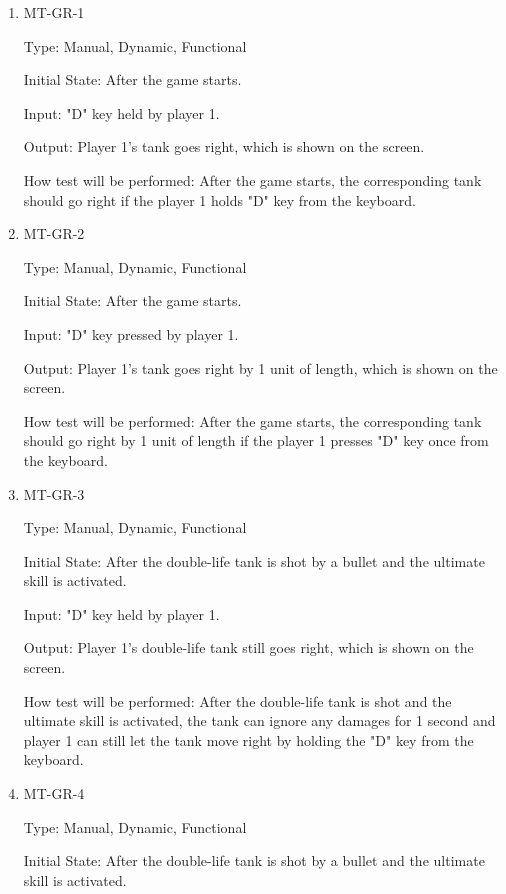 \documentclass[12pt, titlepage]{article}
\begin{document}
\begin{enumerate}

\item{MT-GR-1\\}

Type: Manual, Dynamic, Functional
					
Initial State: After the game starts.
					
Input: "D" key held by player 1.
					
Output: Player 1's tank goes right, which is shown on the screen.
					
How test will be performed: After the game starts, the corresponding tank should go right if the player 1 holds "D" key from the keyboard. 
					
\item{MT-GR-2\\}

Type: Manual, Dynamic, Functional
					
Initial State: After the game starts.
					
Input: "D" key pressed by player 1.
					
Output: Player 1's tank goes right by 1 unit of length, which is shown on the screen.
					
How test will be performed: After the game starts, the corresponding tank should go right by 1 unit of length if the player 1 presses "D" key once from the keyboard. 

\item{MT-GR-3\\}

Type: Manual, Dynamic, Functional
					
Initial State: After the double-life tank is shot by a bullet and the ultimate skill is activated.
					
Input: "D" key held by player 1.
					
Output: Player 1's double-life tank still goes right, which is shown on the screen.
					
How test will be performed: After the double-life tank is shot and the ultimate skill is activated, the tank can ignore any damages for 1 second and player 1 can still let the tank move right by holding the "D" key from the keyboard.

\item{MT-GR-4\\}

Type: Manual, Dynamic, Functional
					
Initial State: After the double-life tank is shot by a bullet and the ultimate skill is activated.
					

\end{enumerate}
\end{document}
